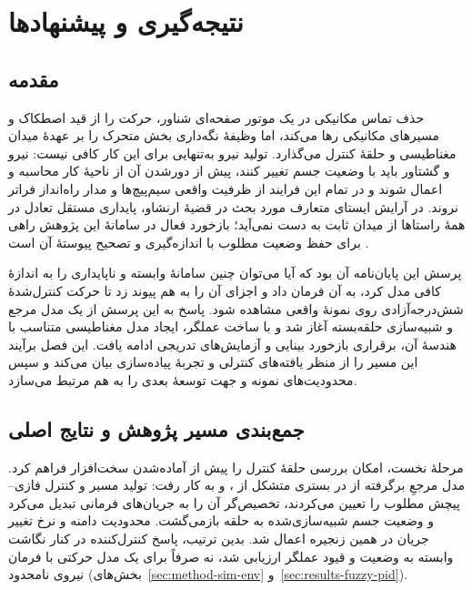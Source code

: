 \chapter{نتیجه‌گیری و پیشنهادها}
\label{ch:conclusion}

\section{مقدمه}

حذف تماس مکانیکی در یک موتور صفحه‌ای شناور، حرکت را از قید اصطکاک و مسیرهای مکانیکی رها می‌کند، اما وظیفهٔ نگه‌داری بخش متحرک را بر عهدهٔ میدان مغناطیسی و حلقهٔ کنترل می‌گذارد. تولید نیرو به‌تنهایی برای این کار کافی نیست: نیرو و گشتاور باید با وضعیت جسم تغییر کنند، پیش از دورشدن آن از ناحیهٔ کار محاسبه و اعمال شوند و در تمام این فرایند از ظرفیت واقعی سیم‌پیچ‌ها و مدار راه‌انداز فراتر نروند. در آرایش ایستای متعارف مورد بحث در قضیهٔ ارنشاو، پایداری مستقل تعادل در همهٔ راستاها از میدان ثابت به دست نمی‌آید؛ بازخورد فعال در سامانهٔ این پژوهش راهی برای حفظ وضعیت مطلوب با اندازه‌گیری و تصحیح پیوستهٔ آن است \cite{jansenModelingMagneticallyLevitated2007}.

پرسش این پایان‌نامه آن بود که آیا می‌توان چنین سامانهٔ وابسته و ناپایداری را به اندازهٔ کافی مدل کرد، به آن فرمان داد و اجزای آن را به هم پیوند زد تا حرکت کنترل‌شدهٔ شش‌درجه‌آزادی روی نمونهٔ واقعی مشاهده شود. پاسخ به این پرسش از یک مدل مرجع و شبیه‌سازی حلقه‌بسته آغاز شد و با ساخت عملگر، ایجاد مدل مغناطیسی متناسب با هندسهٔ آن، برقراری بازخورد بینایی و آزمایش‌های تدریجی ادامه یافت. این فصل برآیند این مسیر را از منظر یافته‌های کنترلی و تجربهٔ پیاده‌سازی بیان می‌کند و سپس محدودیت‌های نمونه و جهت توسعهٔ بعدی را به هم مرتبط می‌سازد.

\section{جمع‌بندی مسیر پژوهش و نتایج اصلی}

مرحلهٔ نخست، امکان بررسی حلقهٔ کنترل را پیش از آماده‌شدن سخت‌افزار فراهم کرد. مدل مرجعِ برگرفته از \cite{xuModularMaglevDesign2024d} در بستری متشکل از ،  و  به کار رفت: تولید مسیر و کنترل فازی-- پیچش مطلوب را تعیین می‌کردند، تخصیص‌گر آن را به جریان‌های فرمانی تبدیل می‌کرد و وضعیت جسم شبیه‌سازی‌شده به حلقه بازمی‌گشت. محدودیت دامنه و نرخ تغییر جریان در همین زنجیره اعمال شد. بدین ترتیب، پاسخ کنترل‌کننده در کنار نگاشت وابسته به وضعیت و قیود عملگر ارزیابی شد، نه صرفاً برای یک مدل حرکتی با فرمان نیروی نامحدود (بخش‌های~\ref{sec:method-sim-env} و~\ref{sec:results-fuzzy-pid}).

